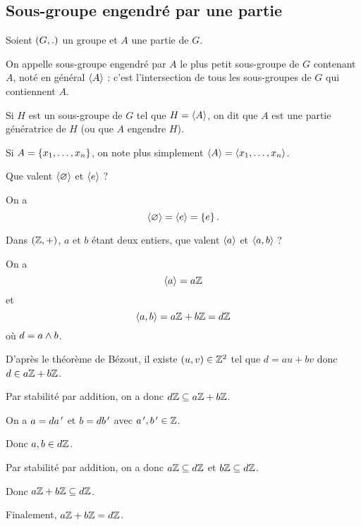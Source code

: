 \subsection{Sous-groupe engendré par une partie}

\begin{defi}
Soient \(\groupe{G}[.]\) un groupe et \(A\) une partie de \(G\).

On appelle sous-groupe engendré par \(A\) le plus petit sous-groupe de \(G\) contenant \(A\), noté en général \(\langle A\rangle\) : c'est l'intersection de tous les sous-groupes de \(G\) qui contiennent \(A\).

Si \(H\) est un sous-groupe de \(G\) tel que \(H=\langle A\rangle\), on dit que \(A\) est une partie génératrice de \(H\) (ou que \(A\) engendre \(H\)).
\end{defi}

Si \(A=\left\lbrace x_1,\dots,x_n\right\rbrace\), on note plus simplement \(\langle A\rangle=\langle x_1,\dots,x_n\rangle\).

\begin{exo}
Que valent \(\langle \varnothing\rangle\) et \(\langle e\rangle\) ?
\end{exo}

\begin{corr}
On a \[\langle \varnothing\rangle=\langle e\rangle=\left\lbrace e\right\rbrace.\]
\end{corr}

\begin{exo}
Dans \(\groupe{\Z}\), \(a\) et \(b\) étant deux entiers, que valent \(\langle a\rangle\) et \(\langle a,b\rangle\) ?
\end{exo}

\begin{corr}
On a \[\langle a\rangle=a\mathbb{Z}\] et \[\langle a,b\rangle=a\mathbb{Z}+b\mathbb{Z}=d\mathbb{Z}\] où \(d=a\land b\).

\increc

D'après le théorème de Bézout, il existe \(\left(u,v\right)\in\mathbb{Z}^2\) tel que \(d=au+bv\) donc \(d\in a\mathbb{Z}+b\mathbb{Z}\).

Par stabilité par addition, on a donc \(d\mathbb{Z}\subseteq a\mathbb{Z}+b\mathbb{Z}\).

\incdir

On a \(a=da^{\,\prime}\) et \(b=db^{\,\prime}\) avec \(a^{\,\prime},b^{\,\prime}\in\mathbb{Z}\).

Donc \(a,b\in d\mathbb{Z}\).

Par stabilité par addition, on a donc \(a\mathbb{Z}\subseteq d\mathbb{Z}\) et \(b\mathbb{Z}\subseteq d\mathbb{Z}\).

Donc \(a\mathbb{Z}+b\mathbb{Z}\subseteq d\mathbb{Z}\).

Finalement, \(a\mathbb{Z}+b\mathbb{Z}=d\mathbb{Z}\).
\end{corr}

